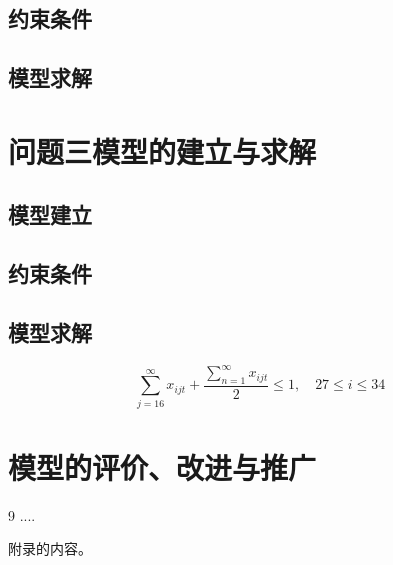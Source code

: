 \documentclass{cumcmthesis}
\begin{document}
        \subsection{约束条件} 
        \subsection{模型求解}
        \section{问题三模型的建立与求解} 
        \subsection{模型建立}
        \subsection{约束条件} 
        \subsection{模型求解}
        \begin{equation}\tag{8}
            \sum_{j=16}^{\infty} x_{ijt} + \frac{\sum_{n=1}^{\infty} x_{ijt}}{2} \leq 1,\quad 27\leq i\leq 34
        \end{equation}
        \section{模型的评价、改进与推广}

        \begin{thebibliography}{9}%
             ....
        \end{thebibliography}

        \begin{appendices}
            附录的内容。
        \end{appendices}
    
\end{document}
